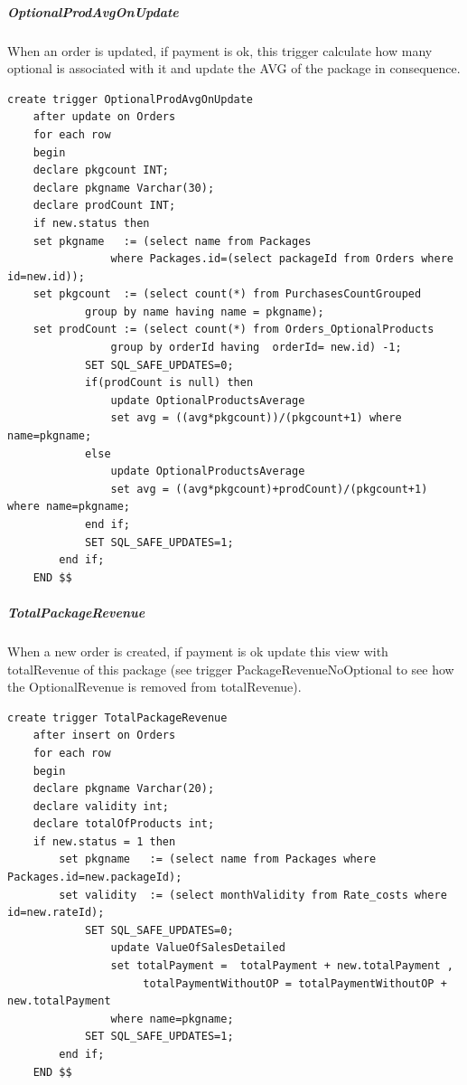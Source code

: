 \documentclass{article}
\begin{document}
\subparagraph{OptionalProdAvgOnUpdate}
When an order is updated, if payment is ok, this trigger calculate how many optional is associated with it and update the AVG of the package in consequence.
\begin{lstlisting}
create trigger OptionalProdAvgOnUpdate
	after update on Orders
    for each row
    begin
	declare pkgcount INT;
    declare pkgname Varchar(30);
    declare prodCount INT;
    if new.status then
    set pkgname   := (select name from Packages 
    			where Packages.id=(select packageId from Orders where id=new.id));
	set pkgcount  := (select count(*) from PurchasesCountGrouped 
			group by name having name = pkgname);
    set prodCount := (select count(*) from Orders_OptionalProducts 
    			group by orderId having  orderId= new.id) -1;
			SET SQL_SAFE_UPDATES=0;
            if(prodCount is null) then
				update OptionalProductsAverage 
				set avg = ((avg*pkgcount))/(pkgcount+1) where name=pkgname;
            else 
				update OptionalProductsAverage 
				set avg = ((avg*pkgcount)+prodCount)/(pkgcount+1) where name=pkgname;
            end if;
            SET SQL_SAFE_UPDATES=1;
        end if;
    END $$
\end{lstlisting}

\subparagraph{TotalPackageRevenue}
When a new order is created, if payment is ok update this view with totalRevenue of this package 
(see trigger PackageRevenueNoOptional to see how the OptionalRevenue is removed from totalRevenue).
\begin{lstlisting}
create trigger TotalPackageRevenue
	after insert on Orders
    for each row
    begin
    declare pkgname Varchar(20);
    declare validity int;
	declare totalOfProducts int;
    if new.status = 1 then
		set pkgname   := (select name from Packages where Packages.id=new.packageId);
		set validity  := (select monthValidity from Rate_costs where id=new.rateId);
			SET SQL_SAFE_UPDATES=0;
				update ValueOfSalesDetailed 
				set totalPayment =  totalPayment + new.totalPayment ,
                     totalPaymentWithoutOP = totalPaymentWithoutOP + new.totalPayment
				where name=pkgname;
			SET SQL_SAFE_UPDATES=1;                     
        end if;
    END $$
\end{lstlisting}
\end{document}

